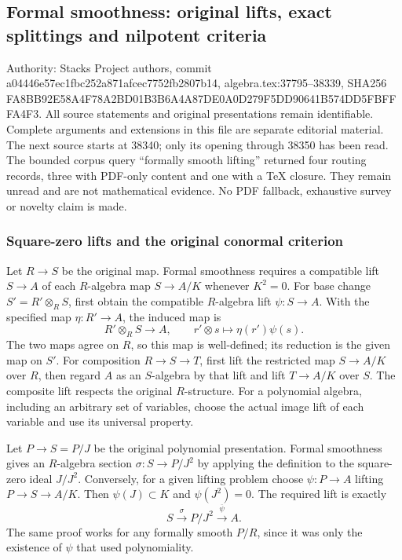 \subsection{Formal smoothness: original lifts, exact splittings and nilpotent criteria}\label{formal-smoothness-original-lifts-exact-splittings-and-nilpotent-criteria}

Authority: Stacks Project authors, commit a04446e57ec1fbc252a871afcec7752fb2807b14, algebra.tex:37795--38339, SHA256 FA8BB92E58A4F78A2BD01B3B6A4A87DE0A0D279F5DD90641B574DD5FBFFFA4F3. All source statements and original presentations remain identifiable. Complete arguments and extensions in this file are separate editorial material. The next source starts at 38340; only its opening through 38350 has been read. The bounded corpus query ``formally smooth lifting'' returned four routing records, three with PDF-only content and one with a TeX closure. They remain unread and are not mathematical evidence. No PDF fallback, exhaustive survey or novelty claim is made.

\subsubsection{Square-zero lifts and the original conormal criterion}\label{square-zero-lifts-and-the-original-conormal-criterion}

Let \(R\to S\) be the original map. Formal smoothness requires a compatible lift \(S\to A\) of each \(R\)-algebra map \(S\to A/K\) whenever \(K^2=0\). For base change \(S'=R'\otimes_RS\), first obtain the compatible \(R\)-algebra lift \(\psi:S\to A\). With the specified map \(\eta:R'\to A\), the induced map is \[
R'\otimes_RS\longrightarrow A,\qquad r'\otimes s\longmapsto\eta(r')\psi(s).
\] The two maps agree on \(R\), so this map is well-defined; its reduction is the given map on \(S'\). For composition \(R\to S\to T\), first lift the restricted map \(S\to A/K\) over \(R\), then regard \(A\) as an \(S\)-algebra by that lift and lift \(T\to A/K\) over \(S\). The composite lift respects the original \(R\)-structure. For a polynomial algebra, including an arbitrary set of variables, choose the actual image lift of each variable and use its universal property.

Let \(P\to S=P/J\) be the original polynomial presentation. Formal smoothness gives an \(R\)-algebra section \(\sigma:S\to P/J^2\) by applying the definition to the square-zero ideal \(J/J^2\). Conversely, for a given lifting problem choose \(\psi:P\to A\) lifting \(P\to S\to A/K\). Then \(\psi(J)\subset K\) and \(\psi(J^2)=0\). The required lift is exactly \[
S\xrightarrow{\sigma}P/J^2\xrightarrow{\overline\psi}A.
\] The same proof works for any formally smooth \(P/R\), since it was only the existence of \(\psi\) that used polynomiality.

